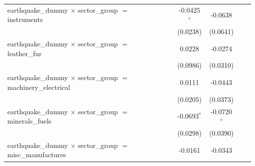 \begin{tabular}{lcccccccc}
   earthquake\_dummy $\times$ sector\_group $=$ instruments                       &                       &                       &                       &                       & -0.0425$^{+}$         & -0.0638               &                       &   \\   
                                                                                  &                       &                       &                       &                       & (0.0238)              & (0.0641)              &                       &   \\   
   earthquake\_dummy $\times$ sector\_group $=$ leather\_fur                      &                       &                       &                       &                       & 0.0228                & -0.0274               &                       &   \\   
                                                                                  &                       &                       &                       &                       & (0.0986)              & (0.0310)              &                       &   \\   
   earthquake\_dummy $\times$ sector\_group $=$ machinery\_electrical             &                       &                       &                       &                       & 0.0111                & -0.0443               &                       &   \\   
                                                                                  &                       &                       &                       &                       & (0.0205)              & (0.0373)              &                       &   \\   
   earthquake\_dummy $\times$ sector\_group $=$ minerals\_fuels                   &                       &                       &                       &                       & -0.0693$^{*}$         & -0.0720$^{+}$         &                       &   \\   
                                                                                  &                       &                       &                       &                       & (0.0298)              & (0.0390)              &                       &   \\   
   earthquake\_dummy $\times$ sector\_group $=$ misc\_manufactures                &                       &                       &                       &                       & -0.0161               & -0.0343               &                       &   \\   

\end{tabular}

